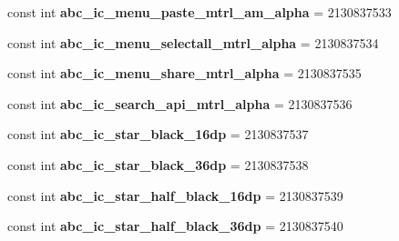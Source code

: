 \begin{DoxyCompactItemize}
const int {\bfseries abc\+\_\+ic\+\_\+menu\+\_\+paste\+\_\+mtrl\+\_\+am\+\_\+alpha} = 2130837533
\item 
\mbox{\label{class_sample_app_1_1_droid_1_1_resource_1_1_drawable_ab0df7d3eeec4d459eb58dba22160b151}} 
const int {\bfseries abc\+\_\+ic\+\_\+menu\+\_\+selectall\+\_\+mtrl\+\_\+alpha} = 2130837534
\item 
\mbox{\label{class_sample_app_1_1_droid_1_1_resource_1_1_drawable_aa6fa4908972e1d4050bbf836485ccbf0}} 
const int {\bfseries abc\+\_\+ic\+\_\+menu\+\_\+share\+\_\+mtrl\+\_\+alpha} = 2130837535
\item 
\mbox{\label{class_sample_app_1_1_droid_1_1_resource_1_1_drawable_acecf2a65b7a2dc87cfad47eeb16bf397}} 
const int {\bfseries abc\+\_\+ic\+\_\+search\+\_\+api\+\_\+mtrl\+\_\+alpha} = 2130837536
\item 
\mbox{\label{class_sample_app_1_1_droid_1_1_resource_1_1_drawable_a5574c6b5ece0ddd6050e3896bd95873f}} 
const int {\bfseries abc\+\_\+ic\+\_\+star\+\_\+black\+\_\+16dp} = 2130837537
\item 
\mbox{\label{class_sample_app_1_1_droid_1_1_resource_1_1_drawable_a00c3e1dbcdc2a488ccfdcf895b5556dd}} 
const int {\bfseries abc\+\_\+ic\+\_\+star\+\_\+black\+\_\+36dp} = 2130837538
\item 
\mbox{\label{class_sample_app_1_1_droid_1_1_resource_1_1_drawable_ae117b4f90c257f60308612db423db204}} 
const int {\bfseries abc\+\_\+ic\+\_\+star\+\_\+half\+\_\+black\+\_\+16dp} = 2130837539
\item 
\mbox{\label{class_sample_app_1_1_droid_1_1_resource_1_1_drawable_a903399e0eff8781e20b37738887815f6}} 
const int {\bfseries abc\+\_\+ic\+\_\+star\+\_\+half\+\_\+black\+\_\+36dp} = 2130837540
\item 
\mbox{\label{class_sample_app_1_1_droid_1_1_resource_1_1_drawable_a978b61cd35fbcb4563602f7a578bce40}} 

\end{DoxyCompactItemize}
